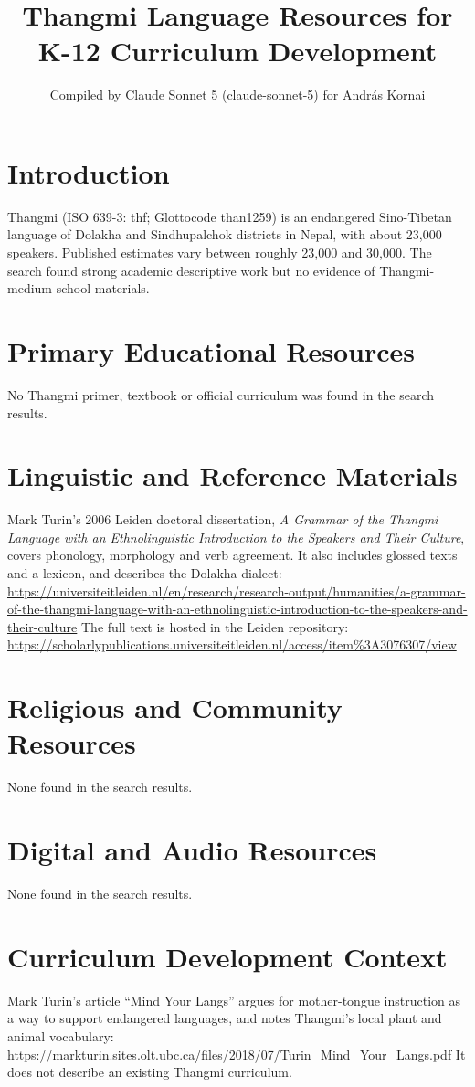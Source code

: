 \documentclass[12pt]{article}
\title{Thangmi Language Resources for K-12 Curriculum Development}
\author{Compiled by Claude Sonnet 5 (claude-sonnet-5) for Andr\'as Kornai}
\date{}
\begin{document}
\maketitle

\section{Introduction}
Thangmi (ISO 639-3: thf; Glottocode than1259) is an endangered Sino-Tibetan language of Dolakha and Sindhupalchok districts in Nepal, with about 23,000 speakers. Published estimates vary between roughly 23,000 and 30,000. The search found strong academic descriptive work but no evidence of Thangmi-medium school materials.

\section{Primary Educational Resources}
No Thangmi primer, textbook or official curriculum was found in the search results.

\section{Linguistic and Reference Materials}
Mark Turin's 2006 Leiden doctoral dissertation, \emph{A Grammar of the Thangmi Language with an Ethnolinguistic Introduction to the Speakers and Their Culture}, covers phonology, morphology and verb agreement. It also includes glossed texts and a lexicon, and describes the Dolakha dialect:
\url{https://universiteitleiden.nl/en/research/research-output/humanities/a-grammar-of-the-thangmi-language-with-an-ethnolinguistic-introduction-to-the-speakers-and-their-culture}
The full text is hosted in the Leiden repository:
\url{https://scholarlypublications.universiteitleiden.nl/access/item%3A3076307/view}

\section{Religious and Community Resources}
None found in the search results.

\section{Digital and Audio Resources}
None found in the search results.

\section{Curriculum Development Context}
Mark Turin's article ``Mind Your Langs'' argues for mother-tongue instruction as a way to support endangered languages, and notes Thangmi's local plant and animal vocabulary:
\url{https://markturin.sites.olt.ubc.ca/files/2018/07/Turin_Mind_Your_Langs.pdf}
It does not describe an existing Thangmi curriculum.
\end{document}
